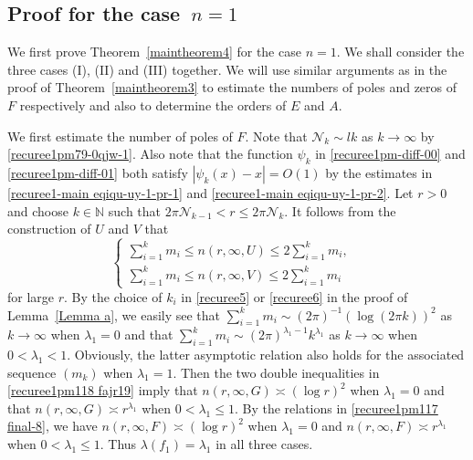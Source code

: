 \documentclass[12pt]{amsart}
\numberwithin{equation}{section}
\begin{document}
\subsection{Proof for the case~$n=1$}\label{Completion of the proof} %

We first prove Theorem~\ref{maintheorem4} for the case $n=1$. We shall consider the three cases (I), (II) and (III) together. We will use similar arguments as in the proof of Theorem~\ref{maintheorem3} to estimate the numbers of poles and zeros of $F$ respectively and also to determine the orders of $E$ and $A$.

We first estimate the number of poles of $F$. Note that $\mathcal{N}_k\sim lk$ as $k\to\infty$ by \eqref{recuree1pm79-0qjw-1}. Also note that the function $\psi_k$ in \eqref{recuree1pm-diff-00} and \eqref{recuree1pm-diff-01} both satisfy $|\psi_k(x)-x|=O(1)$ by  the estimates in \eqref{recuree1-main eqiqu-uy-1-pr-1} and \eqref{recuree1-main eqiqu-uy-1-pr-2}. Let $r>0$ and choose $k\in \mathbb{N}$ such that $2\pi\mathcal{N}_{k-1} <r \leq 2\pi \mathcal{N}_k$. It follows from the construction of $U$ and $V$ that
\begin{equation}\label{recuree1pm118  fajr19}
\left\{
\begin{array}{ll}
\sum_{i=1}^{k}m_i \leq n(r,\infty,U)\leq 2\sum_{i=1}^{k}m_i, &\\
\sum_{i=1}^{k}m_i \leq n(r,\infty,V)\leq 2\sum_{i=1}^{k}m_i &
\end{array}
\right.
\end{equation}
for large $r$. By the choice of $k_i$ in \eqref{recuree5} or \eqref{recuree6} in the proof of Lemma~\ref{Lemma a}, we easily see that $\sum_{i=1}^{k}m_i \sim (2\pi)^{-1} (\log (2\pi k))^2$ as $k\to\infty$ when $\lambda_1=0$ and that $\sum_{i=1}^{k}m_i \sim (2\pi)^{\lambda_1-1} k^{\lambda_1}$ as $k\to\infty$ when $0<\lambda_1<1$. Obviously, the latter asymptotic relation also holds for the associated sequence $(m_k)$ when $\lambda_1=1$. Then the two double inequalities in \eqref{recuree1pm118  fajr19} imply that $n(r,\infty,G)\asymp (\log r)^2$ when $\lambda_1=0$ and that $n(r,\infty,G)\asymp r^{\lambda_1}$ when $0<\lambda_1\leq 1$. By the relations in \eqref{recuree1pm117 final-8}, we have $n(r,\infty,F)\asymp (\log r)^2$ when $\lambda_1=0$ and $n(r,\infty,F)\asymp r^{\lambda_1}$ when $0<\lambda_1\leq 1$. Thus $\lambda(f_1)=\lambda_1$ in all three cases.
\end{document}
